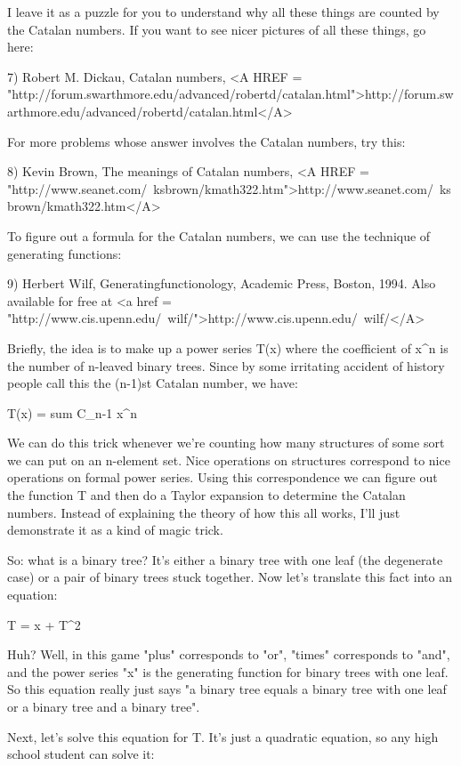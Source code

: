 I leave it as a puzzle for you to understand why all these things are
counted by the Catalan numbers.  If you want to see nicer pictures of
all these things, go here:

7) Robert M. Dickau, Catalan numbers, 
<A HREF = "http://forum.swarthmore.edu/advanced/robertd/catalan.html">http://forum.swarthmore.edu/advanced/robertd/catalan.html</A>

For more problems whose answer involves the Catalan numbers, try 
this:

8) Kevin Brown, The meanings of Catalan numbers, 
<A HREF = "http://www.seanet.com/~ksbrown/kmath322.htm">http://www.seanet.com/~ksbrown/kmath322.htm</A>

To figure out a formula for the Catalan numbers, we can use the
technique of generating functions:

9) Herbert Wilf, Generatingfunctionology, Academic Press, 
Boston, 1994.   Also available for free at <a href = "http://www.cis.upenn.edu/~wilf/">http://www.cis.upenn.edu/~wilf/</A>

Briefly, the idea is to make up a power series T(x) where the coefficient
of x^{n} is the number of n-leaved binary trees.   Since by some 
irritating accident of history people call this the (n-1)st Catalan number, we
have:

T(x) = sum C_{n-1} x^{n}

We can do this trick whenever we're counting how many structures of 
some sort we can put on an n-element set.  Nice operations on structures 
correspond to nice operations on formal power series.  Using this
correspondence we can figure out the function T and then do a Taylor 
expansion to determine the Catalan numbers.   Instead of explaining the 
theory of how this all works, I'll just demonstrate it as a kind of magic 
trick.

So: what is a binary tree?  It's either a binary tree with one leaf 
(the degenerate case) or a pair of binary trees stuck together.  Now 
let's translate this fact into an equation:

T = x + T^{2}

Huh?  Well, in this game "plus" corresponds to "or", "times" corresponds 
to "and", and the power series "x" is the generating function for binary
trees with one leaf.   So this equation really just says "a binary tree 
equals a binary tree with one leaf or a binary tree and a binary tree".

Next, let's solve this equation for T.  It's just a quadratic equation,
so any high school student can solve it:

